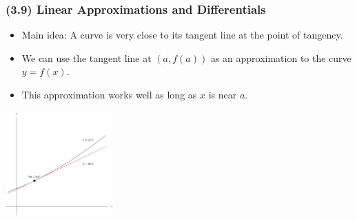 \begin{frame}
\frametitle{(3.9)  Linear Approximations and Differentials}
\begin{itemize}
\item  Main idea: A curve is very close to its tangent line at the point of tangency.
\item  We can use the tangent line at $(a,f(a))$ as an approximation to the curve $y = f(x)$.
\item  This approximation works well as long as $x$ is near $a$.
\end{itemize}
\begin{center}
\includegraphics[height=4cm]{differentials/pictures/03-09-linapprox.pdf}%
\end{center}
\end{frame}
